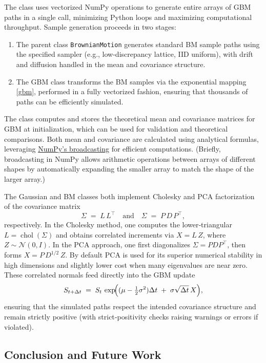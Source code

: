 The class uses vectorized NumPy operations to generate entire arrays of GBM
paths in a single call, minimizing Python loops and maximizing computational
throughput. Sample generation proceeds in two stages:
\begin{enumerate}
\item 
The parent class \texttt{BrownianMotion} generates standard BM sample paths
using the specified sampler (e.g., low-discrepancy lattice, IID uniform), with
drift and diffusion handled in the mean and covariance structure.
\item  The GBM class transforms the BM samples via the exponential mapping
\eqref{gbm}, performed in a fully vectorized fashion, ensuring that thousands of
paths can be efficiently simulated.
\end{enumerate}
The class computes and stores the theoretical mean and covariance matrices for
GBM at initialization, which can be used for validation and theoretical
comparisons. Both mean and covariance are calculated using analytical formulas,
leveraging \href{https:/numpy.org/devdocs/user/basics.broadcasting.html}{NumPy’s
broadcasting} for efficient computations. (Briefly, broadcasting in NumPy allows
arithmetic operations between arrays of different shapes by automatically
expanding the smaller array to match the shape of the larger array.)

 The Gaussian and BM classes both implement Cholesky and PCA factorization of
 the covariance matrix
\[
\Sigma \;=\; L\,L^{\!\top}
\quad\text{and}\quad
\Sigma \;=\; P\,D\,P^{\!\top},
\]
respectively.  In the Cholesky method, one computes the lower‐triangular
$L=\operatorname{chol}(\Sigma)$ and obtains correlated increments via $X=L\,Z$,
where $Z\sim\mathcal{N}(0,I)$.  In the PCA approach, one first diagonalizes
$\Sigma=PDP^{\!\top}$, then forms $X = P\,D^{1/2}\,Z$.  By default PCA is used
for its superior numerical stability in high dimensions and slightly lower cost
when many eigenvalues are near zero.  These correlated normals feed directly
into the GBM update
\[
S_{t+\Delta t} \;=\; S_t\,\exp\!\Bigl((\mu - \tfrac12\sigma^2)\Delta t \;+\;\sigma\sqrt{\Delta t}\,X\Bigr),
\]
ensuring that the simulated paths respect the intended covariance structure and
remain strictly positive (with strict‐positivity checks raising warnings or
errors if violated).

\bigskip
\subsection{Conclusion and Future Work}

